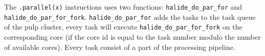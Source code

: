 	The \verb|.parallel(x)| instructions uses two functions: \verb|halide_do_par_for| and \verb|halide_do_par_for_fork|. \verb|halide_do_par_for| adds the tasks to the task queue of the pulp cluster, every task will execute  \verb|halide_do_par_for_fork| on the corresponding core (if the core id is equal to the task number modulo the number of available cores). Every task consist of a part of the processing pipeline.


